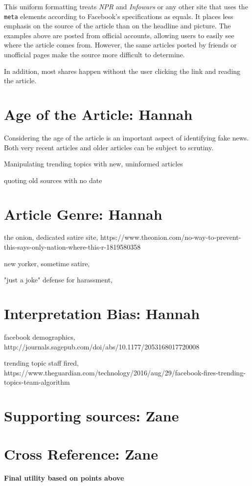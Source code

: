 \documentclass[12pt]{article}
\begin{document}
This uniform formatting treats {\it NPR} and {\it Infowars} or any other site that uses the \texttt{meta} elements according to Facebook's specifications as equals. It places less emphasis on the source of the article than on the headline and picture. The examples above are posted from official accounts, allowing users to easily see where the article comes from. However, the same articles posted by friends or unofficial pages make the source more difficult to determine.

In addition, most shares happen without the user clicking the link and reading the article.



\section{Age of the Article: Hannah}
Considering the age of the article is an important aspect of identifying fake news. Both very recent articles and older articles can be subject to scrutiny.

Manipulating trending topics with new, uninformed articles

quoting old sources with no date



\section{Article Genre: Hannah}

the onion, dedicated satire site, https://www.theonion.com/no-way-to-prevent-this-says-only-nation-where-this-r-1819580358

new yorker, sometime satire, 

"just a joke" defense for harassment, 



\section{Interpretation Bias: Hannah}

facebook demographics, http://journals.sagepub.com/doi/abs/10.1177/2053168017720008

trending topic staff fired, https://www.theguardian.com/technology/2016/aug/29/facebook-fires-trending-topics-team-algorithm


\section{Supporting sources: Zane}


\section{Cross Reference: Zane}



\paragraph{Final utility based on points above}

\newpage


\end{document}
